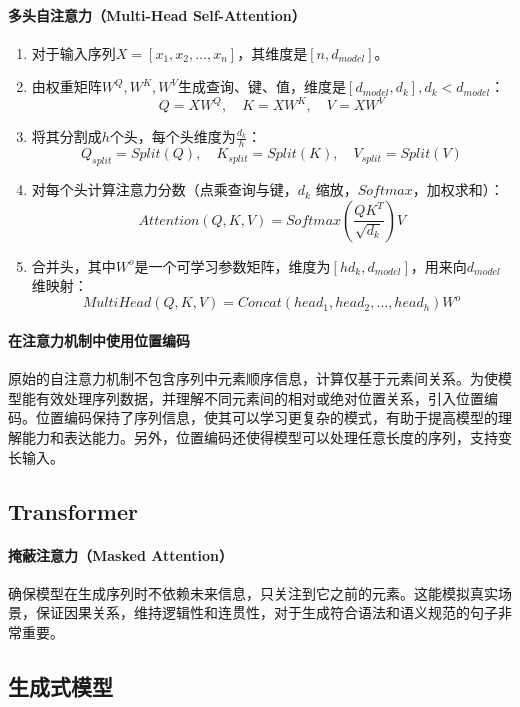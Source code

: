 \documentclass[
12pt, %
a4paper, 
oneside, %
headinclude,footinclude, %
]{scrartcl}
\begin{document}
\paragraph{多头自注意力（Multi-Head Self-Attention）}
\begin{enumerate}
\item 对于输入序列$ X = [x_1, x_2, \ldots, x_n] $，其维度是$ [n, d_{model}] $。
\item 由权重矩阵$ W^Q,  W^K, W^V $生成查询、键、值，维度是$ [d_{model}, d_k], d_k < d_{model} $：
$$ Q = X W^Q, \quad K = X W^K, \quad V = X W^V $$
\item 将其分割成$ h $个头，每个头维度为$ \frac{d_k}{h} $：
$$ Q_{split} = Split(Q), \quad K_{split} = Split(K), \quad V_{split} = Split(V) $$
\item 对每个头计算注意力分数（点乘查询与键，$ d_k $ 缩放，$ Softmax $，加权求和）：
$$ Attention(Q, K, V) = Softmax(\frac{QK^T}{\sqrt{d_k}})V $$ 
\item 合并头，其中$ W^o $是一个可学习参数矩阵，维度为$ [hd_k, d_{model}] $，用来向$ d_{model} $维映射：
$$ MultiHead(Q, K, V) = Concat(head_1, head_2, \ldots, head_h)W^o $$ 
\end{enumerate}
\paragraph{在注意力机制中使用位置编码}
原始的自注意力机制不包含序列中元素顺序信息，计算仅基于元素间关系。为使模型能有效处理序列数据，并理解不同元素间的相对或绝对位置关系，引入位置编码。位置编码保持了序列信息，使其可以学习更复杂的模式，有助于提高模型的理解能力和表达能力。另外，位置编码还使得模型可以处理任意长度的序列，支持变长输入。
\subsection[Transformer]{Transformer}
\paragraph{掩蔽注意力（Masked Attention）}
确保模型在生成序列时不依赖未来信息，只关注到它之前的元素。这能模拟真实场景，保证因果关系，维持逻辑性和连贯性，对于生成符合语法和语义规范的句子非常重要。
\subsection[生成式模型]{生成式模型}
\end{document}
